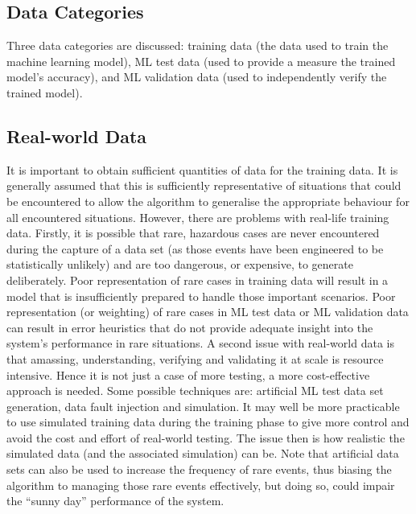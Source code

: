 \subsection{Data Categories}
Three data categories are discussed: training data (the data used to train the machine learning model),
\cbstart
ML test data (used to provide a measure the trained model’s accuracy), and ML
\cbend
validation data (used to independently verify the trained model).  

\subsection{Real-world Data}
It is important to obtain sufficient quantities of data for the training data. It is generally assumed that this is sufficiently representative of situations that could be encountered to allow the algorithm to generalise the appropriate behaviour for all encountered situations.  However, there are problems with real-life training data. Firstly, it is possible that rare, hazardous cases are never encountered during the capture of a data set (as those events have been engineered to be statistically unlikely) and are too dangerous, or expensive, to generate deliberately. Poor representation of rare cases in training data will result in a model that is insufficiently prepared to handle those important scenarios. Poor representation (or weighting) of rare cases in
\cbstart
ML test data or ML
\cbend
validation data can result in error heuristics that do not provide adequate insight into the system’s performance in rare situations. A second issue with real-world data is that amassing, understanding, verifying and validating it at scale is resource intensive.
Hence it is not just a case of more testing, a more cost-effective approach is needed. Some possible techniques are: artificial
\cbstart
ML
\cbend
test data set generation, data fault injection and simulation. It may well be more practicable to use simulated training data during the training phase to give more control and avoid the cost and effort of real-world testing. The issue then is how realistic the simulated data (and the associated simulation) can be. Note that artificial data sets can also be used to increase the frequency of rare events, thus biasing the algorithm to managing those rare events effectively, but doing so, could impair the ``sunny day'' performance of the system.

